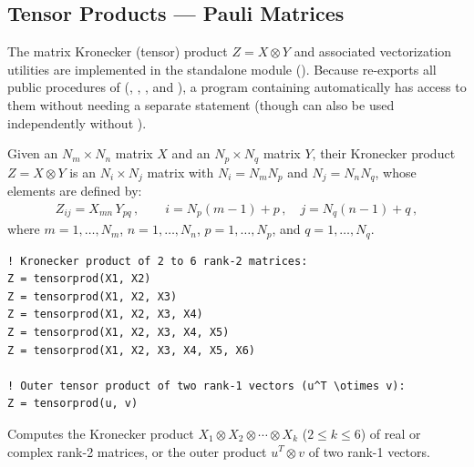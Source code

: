 \subsection{Tensor Products --- Pauli Matrices}
\label{subsec:tensor_products}

The matrix Kronecker (tensor) product $Z = X \otimes Y$ and associated vectorization utilities are implemented in the standalone module  (). Because  re-exports all public procedures of  (, , , and ), a program containing  automatically has access to them without needing a separate  statement (though  can also be used independently without ).

Given an $N_m\times N_n$ matrix $X$ and an $N_p\times N_q$ matrix $Y$, their Kronecker product $Z = X \otimes Y$ is an $N_i\times N_j$ matrix with $N_i = N_m N_p$ and $N_j = N_n N_q$, whose elements are defined by:
\begin{align}
  Z_{ij} = X_{mn}\, Y_{pq}\, , \qquad
  i = N_p (m - 1) + p\, , \quad
  j = N_q (n - 1) + q\, ,
\end{align}
where $m=1,\ldots,N_m$, $n=1,\ldots,N_n$, $p=1,\ldots,N_p$, and $q=1,\ldots,N_q$.


\lstset{language=[95]Fortran}
\begin{lstlisting}
! Kronecker product of 2 to 6 rank-2 matrices:
Z = tensorprod(X1, X2)
Z = tensorprod(X1, X2, X3)
Z = tensorprod(X1, X2, X3, X4)
Z = tensorprod(X1, X2, X3, X4, X5)
Z = tensorprod(X1, X2, X3, X4, X5, X6)

! Outer tensor product of two rank-1 vectors (u^T \otimes v):
Z = tensorprod(u, v)
\end{lstlisting}

Computes the Kronecker product $X_1 \otimes X_2 \otimes \cdots \otimes X_k$ ($2 \le k \le 6$) of real or complex rank-2 matrices, or the outer product $u^T \otimes v$ of two rank-1 vectors.

